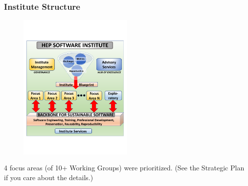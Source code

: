 \begin{frame}
\frametitle{Institute Structure}

\begin{figure}[ht]
\begin{center}
\includegraphics[width=0.5\textwidth]{images/S2I2-HEP_elements_general.pdf}
\label{fig:s2i2_elements}
\end{center}
\end{figure}

\small{4 focus areas (of 10+ Working Groups) were prioritized. (See the Strategic Plan if you care about the details.)}

\end{frame}



